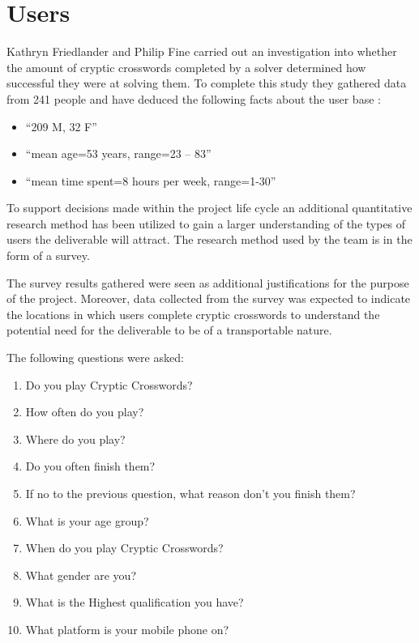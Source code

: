 \section{Users} 

Kathryn Friedlander and Philip Fine \citep{friedlander09} carried out an
investigation into whether the amount of cryptic crosswords completed by a
solver determined how successful they were at solving them. To complete this
study they gathered data from 241 people and have deduced the following facts 
about the user base \citep{friedlander09}:

\begin{itemize}
  \item ``209 M, 32 F''
  \item ``mean age=53 years, range=23 -- 83''
  \item ``mean time spent=8 hours per week, range=1-30''
\end{itemize}

To support decisions made within the project life cycle an additional
quantitative research method has been utilized to gain a larger understanding
of the types of users the deliverable will attract. The research method used by 
the team is in the form of a survey. 

The survey results gathered were seen as additional justifications for the 
purpose of the project. Moreover, data collected from the survey was expected to
indicate the locations in which users complete cryptic crosswords to understand 
the potential need for the deliverable to be of a transportable nature.

The following questions were asked:

\begin{enumerate}
  \item Do you play Cryptic Crosswords?
  \item How often do you play?
  \item Where do you play?
  \item Do you often finish them?
  \item If no to the previous question, what reason don't you finish them?
  \item What is your age group?
  \item When do you play Cryptic Crosswords?
  \item What gender are you?
  \item What is the Highest qualification you have?
  \item What platform is your mobile phone on?
\end{enumerate}

